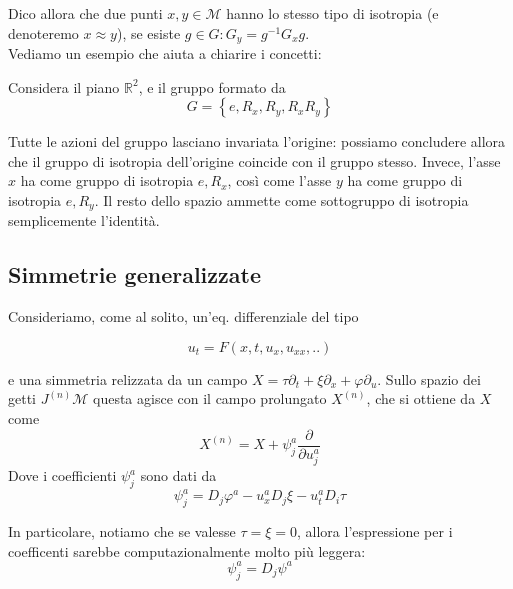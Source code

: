 \documentclass{report}
\begin{document}
    Dico allora che due punti $x, y \in \mathcal{M}$ hanno lo stesso tipo di isotropia (e denoteremo $x \approx y$), se esiste $g \in G : G_y = g^{-1}G_xg$.\\

    Vediamo un esempio che aiuta a chiarire i concetti: 

    \begin{example}
        Considera il piano $\mathbb{R}^2$, e il gruppo formato da 
        \begin{equation}
            G = \left\{e, R_x, R_y, R_xR_y \right\}
        \end{equation}

        Tutte le azioni del gruppo lasciano invariata l'origine: possiamo concludere allora che il gruppo di isotropia dell'origine coincide con il gruppo stesso. Invece, l'asse $x$ ha come gruppo di isotropia $e, R_x$, così come l'asse $y$ ha come gruppo di isotropia $e, R_y$. Il resto dello spazio ammette come sottogruppo di isotropia semplicemente l'identità. 
    \end{example}

\subsection{Simmetrie generalizzate}

Consideriamo, come al solito, un'eq. differenziale del tipo 

\begin{equation}
    u_t = F(x, t, u_x, u_{xx}, ..)
\end{equation}

e una simmetria relizzata da un campo $X= \tau\partial_t + \xi\partial_x + \varphi\partial_u$. Sullo spazio dei getti $J^{(n)}\mathcal{M}$ questa agisce con il campo prolungato $X^{(n)}$, che si ottiene da $X$ come 
\begin{equation}
    X^{(n)} = X + \psi^a_j \frac{\partial}{\partial u^a_j}
\end{equation}
Dove i coefficienti $\psi^a_j$ sono dati da 
\begin{equation}
    \psi^a_j = D_j \varphi^a - u_x^a D_j \xi - u^a_t D_i \tau
\end{equation}

In particolare, notiamo che se valesse $\tau = \xi =0 $, allora l'espressione per i coefficenti sarebbe computazionalmente molto più leggera: 
\begin{equation}
    \psi^a_j = D_j \psi^a
\end{equation}
\end{document}
